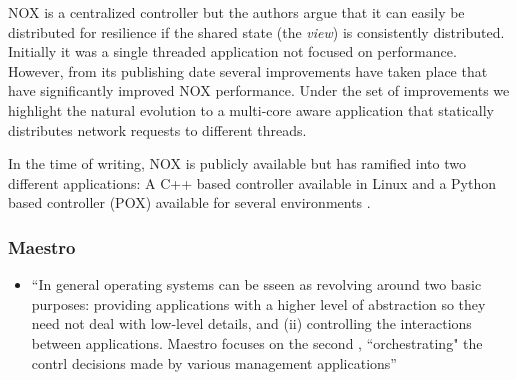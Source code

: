 \documentclass[12pt,openright,twoside]{report}
\begin{document}
\begin{itemize}
NOX is a centralized controller  but the authors argue that it can easily be distributed for resilience if the shared state (the \emph{view}) is consistently distributed. 
Initially it was a single threaded application not focused on
performance. However, from its publishing date 
several improvements have taken place
\cite{Tootoonchian:2012uia,zen-doc-thesis} that have significantly improved
NOX performance. Under the set of improvements we highlight the
natural evolution to a multi-core aware application
that statically distributes network requests to different threads. 

In the time of writing, NOX is publicly available but has ramified into
two different applications: A C++ based controller available in
Linux and a Python  based controller (POX) available for
several environments \cite{nox}.

\subsubsection{Maestro}
\begin{itemize}
\item ``In general operating systems can be sseen as revolving around two basic purposes: providing applications with a higher level of abstraction so they need not deal with low-level details, and (ii) controlling the interactions between applications. Maestro focuses on the second , ``orchestrating" the contrl decisions made by various management applications''
\end{itemize}


\end{itemize}
\end{document}
